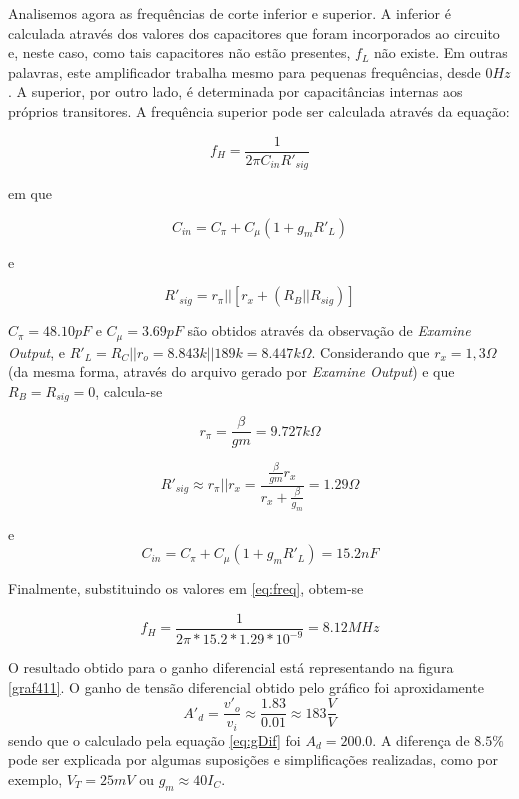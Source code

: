 \documentclass[12pt, a4paper]{article}
\begin{document}
\begin{enumerate}
    Analisemos agora as frequências de corte inferior e superior. A inferior é calculada através dos valores dos capacitores que foram incorporados ao circuito e, neste caso, como tais capacitores não estão presentes, \(f_L\) não existe. Em outras palavras, este amplificador trabalha mesmo para pequenas frequências, desde \(0Hz\). A superior, por outro lado, é determinada por capacitâncias internas aos próprios transitores. A frequência superior pode ser calculada através da equação:
    
    \begin{equation} \label{eq:freq}
    f_H = \frac{1}{2 \pi C_{in} R'_{sig}} 
    \end{equation}
    
    em que 
    
    \begin{equation}
    C_{in} = C_{\pi } + C_{\mu }(1+ g_m R'_L)
    \end{equation}
    
    e
    
    \begin{equation}
    R'_{sig} = r_{\pi } || [ r_x + (R_B||R_{sig}) ]
    \end{equation}
        
    
    \(C_{\pi } = 48.10 pF\) e \(C_{\mu } = 3.69 pF\) são obtidos através da observação de \textit{Examine Output}, e \(R'_L = R_C||r_o = 8.843k || 189k = 8.447k \Omega \). Considerando que \( r_x = 1,3 \Omega \) (da mesma forma, através do arquivo gerado por \textit{Examine Output}) e que \(R_B = R_{sig} = 0\), calcula-se 
    
    \begin{equation} \label{eq:rpi}
    r_{\pi } = \frac{\beta}{gm} = 9.727k\Omega
    \end{equation}
    
    \[R'_{sig} \approx r_{\pi } || r_x = \frac{\frac{\beta}{gm} r_x}{r_x + \frac{\beta }{g_m}} = 1.29 \Omega \]
    
    e 
    \[C_{in} = C_{\pi } + C_{\mu }(1+ g_m R'_{L}) =  15.2nF\]
    
    Finalmente, substituindo os valores em \ref{eq:freq}, obtem-se
    
    \[f_H = \frac{1}{2\pi *15.2*1.29*10^{-9}} = 8.12MHz \]
    
    O resultado obtido para o ganho diferencial está representando na figura \ref{graf411}. O ganho de tensão diferencial obtido pelo gráfico foi aproxidamente \[A'_d = \frac{v'_o}{v_i} \approx \frac{1.83}{0.01} \approx 183 \frac{V}{V}\] sendo que o calculado pela equação \ref{eq:gDif} foi \(A_d = 200.0\). A diferença de \(8.5 \% \) pode ser explicada por algumas suposições e simplificações realizadas, como por exemplo, \(V_T = 25mV\) ou \(g_m \approx 40I_C \). 
    

\end{enumerate}
\end{document}
